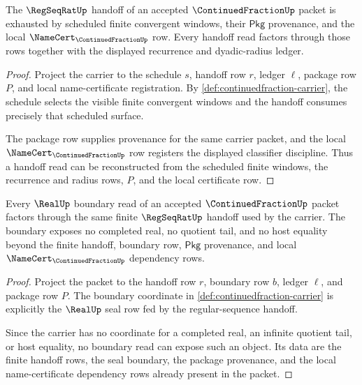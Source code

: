 \begin{theorem}
\label{thm:continuedfraction-obligation-finite-handoff}
The $\RegSeqRatUp$ handoff of an accepted $\ContinuedFractionUp$ packet is
exhausted by scheduled finite convergent windows, their $\mathsf{Pkg}$
provenance, and the local $\NameCert_{\ContinuedFractionUp}$ row. Every handoff
read factors through those rows together with the displayed recurrence and
dyadic-radius ledger.
\end{theorem}
\begin{proof}
Project the carrier to the schedule $s$, handoff row $r$, ledger $\ell$, package
row $P$, and local name-certificate registration. By
\autoref{def:continuedfraction-carrier}, the schedule selects the visible
finite convergent windows and the handoff consumes precisely that scheduled
surface.

The package row supplies provenance for the same carrier packet, and the local
$\NameCert_{\ContinuedFractionUp}$ row registers the displayed classifier
discipline. Thus a handoff read can be reconstructed from the scheduled finite
windows, the recurrence and radius rows, $P$, and the local certificate row.
\end{proof}

\begin{theorem}
\label{thm:continuedfraction-obligation-real-boundary}
Every $\RealUp$ boundary read of an accepted $\ContinuedFractionUp$ packet
factors through the same finite $\RegSeqRatUp$ handoff used by the carrier. The
boundary exposes no completed real, no quotient tail, and no host equality
beyond the finite handoff, boundary row, $\mathsf{Pkg}$ provenance, and local
$\NameCert_{\ContinuedFractionUp}$ dependency rows.
\end{theorem}
\begin{proof}
Project the packet to the handoff row $r$, boundary row $b$, ledger $\ell$, and
package row $P$. The boundary coordinate in
\autoref{def:continuedfraction-carrier} is explicitly the $\RealUp$ seal row
fed by the regular-sequence handoff.

Since the carrier has no coordinate for a completed real, an infinite quotient
tail, or host equality, no boundary read can expose such an object. Its data are
the finite handoff rows, the seal boundary, the package provenance, and the
local name-certificate dependency rows already present in the packet.
\end{proof}

